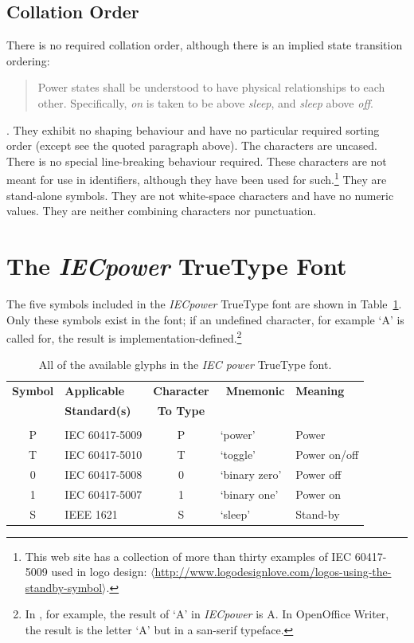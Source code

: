 \documentclass[10pt,a4paper]{article}
\newcommand{\URL}[1]{$\langle$\url{#1}$\rangle$}
\newcommand{\IEC}[1]{{\fontspec{IECpower}#1}}
\begin{document}
\subsection{Collation Order}\label{section:collation-order}

There is no required collation order, although there is an implied state transition
ordering:

\begin{quote}
Power states shall be understood to have physical relationships to each other.
Specifically, \emph{on} is taken to be above \emph{sleep}, and \emph{sleep} above
\emph{off}.
\end{quote}

\noindent \cite[\S 4.4, emphasis in original]{IEEE1621}. They exhibit no shaping
behaviour and have no particular required sorting order (except see the quoted
paragraph above). The characters are uncased. There is no special line-breaking
behaviour required. These characters are not meant for use in identifiers,
although they have been used for such.\footnote{This web site has a collection
of more than thirty examples of IEC 60417-5009 used in logo design:
\URL{http://www.logodesignlove.com/logos-using-the-standby-symbol}.} They are
stand-alone symbols.  They are not white-space characters and have no numeric
values. They are neither combining characters nor punctuation.

\section{The \emph{IECpower} TrueType Font}

The five symbols included in the \emph{IECpower} TrueType font are shown in
Table~\ref{table:symbols}. Only these symbols exist in the font; if an undefined
character, for example `A' is called for, the result is
implementation-defined.\footnote{In , for example, the result of
`A' in \emph{IECpower} is \IEC{A}.  In OpenOffice Writer, the result is the
letter `A' but in a san-serif typeface.}

\begin{table}[htbp]
	\centering
	\begin{tabular}{clcll}
		\textbf{Symbol} & \textbf{Applicable} & \textbf{Character} & \
			\textbf{Mnemonic} & \textbf{Meaning} \\
		& \textbf{Standard(s)} & \textbf{To Type} \\
		\hline \\
		\IEC{P} & IEC 60417-5009 & P & `power'       & Power        \\
		\IEC{T} & IEC 60417-5010 & T & `toggle'      & Power on/off \\
		\IEC{0} & IEC 60417-5008 & 0 & `binary zero' & Power off    \\
		\IEC{1} & IEC 60417-5007 & 1 & `binary one'  & Power on     \\
		\IEC{S} & IEEE 1621      & S & `sleep'       & Stand-by     \\
    \end{tabular}
    \caption{All of the available glyphs in the \emph{IEC power} TrueType font.}
    \label{table:symbols} %
\end{table}
\end{document}
